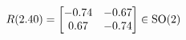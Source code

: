 \documentclass[preview]{standalone}
\begin{document}
\begin{align*}
\special{dvisvgm:raw <g id='unique000'>}R(2.40) = \begin{bmatrix} -0.74 & -0.67 \\ 0.67 & -0.74 \end{bmatrix} \in \text{SO}(2)\special{dvisvgm:raw </g>}
\end{align*}
\end{document}
